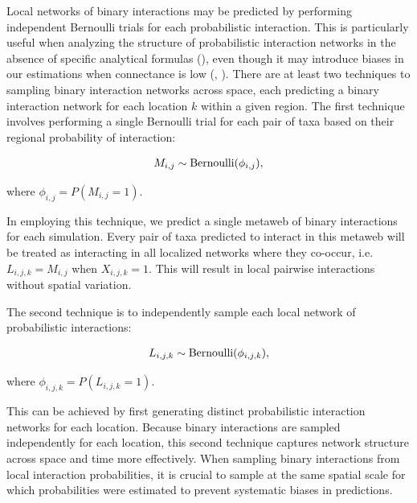 \begin{box2.5}

Local networks of binary interactions may be predicted by performing independent
Bernoulli trials for each probabilistic interaction. This is particularly useful
when analyzing the structure of probabilistic interaction networks in the
absence of specific analytical formulas (\cite{Poisot2016Structure}), even
though it may introduce biases in our estimations when connectance is low
(\cite{Poisot2014When}, \cite{Chagnon2015Characterizing}). There are at least
two techniques to sampling binary interaction networks across space, each
predicting a binary interaction network for each location $k$ within a given
region. The first technique involves performing a single Bernoulli trial for
each pair of taxa based on their regional probability of interaction: 

\begin{eqnarray}
  \label{eq:sampling1}
  M_{i, j} \sim {\rm Bernoulli}(\phi_{i,j}),
\end{eqnarray}

where $\phi_{i,j} = P(M_{i, j} = 1)$.

In employing this technique, we predict a single metaweb of binary
interactions for each simulation. Every pair of taxa predicted to interact in
this metaweb will be treated as interacting in all localized networks where
they co-occur, i.e. $L_{i, j, k} = M_{i, j}$ when $X_{i,j,k} = 1$. This will
result in local pairwise interactions without spatial variation. 

The second technique is to independently sample each local network of
probabilistic interactions: 

\begin{eqnarray}
  \label{eq:sampling2}
  L_{i, j, k} \sim {\rm Bernoulli}(\phi_{i,j,k}),
\end{eqnarray}

where $\phi_{i,j,k} = P(L_{i, j, k} = 1)$.

This can be achieved by first generating distinct probabilistic interaction
networks for each location. Because binary interactions are sampled
independently for each location, this second technique captures network
structure across space and time more effectively. When sampling binary
interactions from local interaction probabilities, it is crucial to sample at
the same spatial scale for which probabilities were estimated to prevent
systematic biases in predictions.


\end{box2.5}
